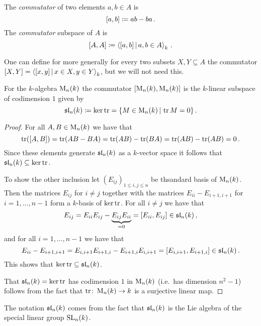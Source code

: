 \begin{definition}
  The \emph{commutator} of two elements $a, b \in A$ is
  \[
              [a,b]
    \coloneqq  ab - ba \,.
  \]
  The \emph{commutator} subspace of $A$ is
  \[
              [A,A]
    \defined  \gen{ [a,b] \suchthat a, b \in A }_k \,.
  \]
\end{definition}


\begin{remark}
  One can define for more generally for every two subsets $X, Y \subseteq A$ the commutator $[X, Y] = \gen{ [x,y] \suchthat x \in X, y \in Y}_k$, but we will not need this.
\end{remark}


\begin{lemma}
  For the $k$-algebra $\operatorname{M}_n(k)$ the commutator $[\operatorname{M}_n(k), \operatorname{M}_n(k)]$ is the $k$-linear subspace of codimension $1$ given by
  \[
              \sllie_n(k)
    \defined  \ker \tr
    =         \{
                M \in \Mat_n(k)
              \suchthat
                \tr M = 0
              \} \,.
  \]
\end{lemma}


\begin{proof}
  For all $A, B \in \operatorname{M}_n(k)$ we have that
  \[
      \operatorname{tr}( [A,B] )
    = \operatorname{tr}(AB - BA)
    = \operatorname{tr}(AB) - \operatorname{tr}(BA)
    = \operatorname{tr}(AB) - \operatorname{tr}(AB)
    = 0 \,.
  \]
  Since these elements generate $\operatorname{\mathfrak{sl}}_n(k)$ as a $k$-vector space it follows that $\operatorname{\mathfrak{sl}}_n(k) \subseteq \ker \operatorname{tr}$.
  
  To show the other inclusion let $(E_{ij})_{1 \leq i,j \leq n}$ be thsandard basis of $\operatorname{M}_n(k)$.
  Then the matrices $E_{ij}$ for $i \neq j$ together with the matrices $E_{ii} - E_{i+1,i+1}$ for $i = 1, \dotsc, n-1$ form a $k$-basis of $\ker \operatorname{tr}$.
  For all  $i \neq j$ we have that
  \[
        E_{ij}
    =   E_{ii} E_{ij} - \underbrace{E_{ij} E_{ii}}_{=0}
    =   [E_{ii}, E_{ij}]
    \in \operatorname{\mathfrak{sl}}_n(k) \,,
  \]
  and for all $i = 1, \dotsc, n-1$ we have that
  \[
        E_{ii} - E_{i+1,i+1}
    =   E_{i,i+1} E_{i+1,i} - E_{i+1,i} E_{i,i+1}
    =   [E_{i,i+1}, E_{i+1,i}]
    \in \operatorname{\mathfrak{sl}}_n(k) \,.
  \]
  This shows that $\ker \operatorname{tr} \subseteq \operatorname{\mathfrak{sl}}_n(k)$.
  
  That $\operatorname{\mathfrak{sl}}_n(k) = \ker \operatorname{tr}$ has codimension $1$ in $\operatorname{M}_n(k)$ (i.e.\ has dimension $n^2 - 1$) follows from the fact that $\operatorname{tr} \colon \operatorname{M}_n(k) \to k$ is a surjective linear map.
\end{proof}


\begin{remark}
  The notation $\operatorname{\mathfrak{sl}}_n(k)$ comes from the fact that $\operatorname{\mathfrak{sl}}_n(k)$ is the Lie algebra of the special linear group $\operatorname{SL}_n(k)$.
\end{remark}


